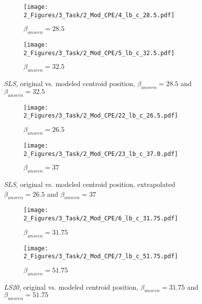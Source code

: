 \begin{figure}[!h]
    \begin{subfigure}{0.5\textwidth}
        \centering
        \caption{$\beta_{unseen} = 28.5$ }
        \texttt{[image: 2\_Figures/3\_Task/2\_Mod\_CPE/4\_lb\_c\_28.5.pdf]}
        \label{fig_48_0}    
    \end{subfigure}%
    \hfill
    \begin{subfigure}{0.5\textwidth}
        \centering
        \caption{$\beta_{unseen} = 32.5$ }
        \texttt{[image: 2\_Figures/3\_Task/2\_Mod\_CPE/5\_lb\_c\_32.5.pdf]}
        \label{fig_48_1}    
    \end{subfigure}
    \vspace{-0.3cm}
    \caption{\emph{SLS}, original vs. modeled centroid position, $\beta_{unseen} = 28.5$ and $\beta_{unseen} = 32.5$ }
    \label{fig_48}    
\end{figure}

\begin{figure}[!h]
    \begin{subfigure}{0.5\textwidth}
        \centering
        \caption{$\beta_{unseen} = 26.5$ }
        \texttt{[image: 2\_Figures/3\_Task/2\_Mod\_CPE/22\_lb\_c\_26.5.pdf]}
        \label{fig_49_0}    
    \end{subfigure}%
    \hfill
    \begin{subfigure}{0.5\textwidth}
        \centering
        \caption{$\beta_{unseen} = 37$ }
        \texttt{[image: 2\_Figures/3\_Task/2\_Mod\_CPE/23\_lb\_c\_37.0.pdf]}
        \label{fig_49_1}    
    \end{subfigure}
    \vspace{-0.3cm}
    \caption{\emph{SLS}, original vs. modeled centroid position, extrapolated $\beta_{unseen} = 26.5$ and $\beta_{unseen} = 37$ }
    \label{fig_49}    
\end{figure}


\begin{figure}[!h]
    \begin{subfigure}{.5\textwidth}
        \centering
        \caption{$\beta_{unseen} = 31.75$}
        \texttt{[image: 2\_Figures/3\_Task/2\_Mod\_CPE/6\_lb\_c\_31.75.pdf]}
    \end{subfigure}%
    \hfill
    \begin{subfigure}{.5\textwidth}
        \centering
        \caption{$\beta_{unseen} = 51.75$ }
        \texttt{[image: 2\_Figures/3\_Task/2\_Mod\_CPE/7\_lb\_c\_51.75.pdf]}
    \end{subfigure}
    \vspace{-0.3cm}
    \caption{\emph{LS20}, original vs. modeled centroid position, $\beta_{unseen} = 31.75$ and $\beta_{unseen} = 51.75$}
    \label{fig_50}    
\end{figure}

